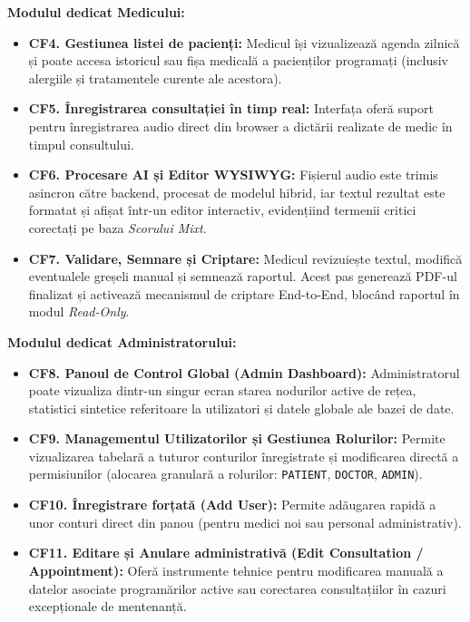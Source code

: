 \textbf{Modulul dedicat Medicului:}
\begin{itemize}
    \item \textbf{CF4. Gestiunea listei de pacienți:} Medicul își vizualizează agenda zilnică și poate accesa istoricul sau fișa medicală a pacienților programați (inclusiv alergiile și tratamentele curente ale acestora).
    \item \textbf{CF5. Înregistrarea consultației în timp real:} Interfața oferă suport pentru înregistrarea audio direct din browser a dictării realizate de medic în timpul consultului.
    \item \textbf{CF6. Procesare AI și Editor WYSIWYG:} Fișierul audio este trimis asincron către backend, procesat de modelul hibrid, iar textul rezultat este formatat și afișat într-un editor interactiv, evidențiind termenii critici corectați pe baza \textit{Scorului Mixt}.
    \item \textbf{CF7. Validare, Semnare și Criptare:} Medicul revizuiește textul, modifică eventualele greșeli manual și semnează raportul. Acest pas generează PDF-ul finalizat și activează mecanismul de criptare End-to-End, blocând raportul în modul \textit{Read-Only}.
\end{itemize}

\textbf{Modulul dedicat Administratorului:}
\begin{itemize}
    \item \textbf{CF8. Panoul de Control Global (Admin Dashboard):} Administratorul poate vizualiza dintr-un singur ecran starea nodurilor active de rețea, statistici sintetice referitoare la utilizatori și datele globale ale bazei de date.
    \item \textbf{CF9. Managementul Utilizatorilor și Gestiunea Rolurilor:} Permite vizualizarea tabelară a tuturor conturilor înregistrate și modificarea directă a permisiunilor (alocarea granulară a rolurilor: \texttt{PATIENT}, \texttt{DOCTOR}, \texttt{ADMIN}).
    \item \textbf{CF10. Înregistrare forțată (Add User):} Permite adăugarea rapidă a unor conturi direct din panou (pentru medici noi sau personal administrativ).
    \item \textbf{CF11. Editare și Anulare administrativă (Edit Consultation / Appointment):} Oferă instrumente tehnice pentru modificarea manuală a datelor asociate programărilor active sau corectarea consultațiilor în cazuri excepționale de mentenanță.
\end{itemize}

